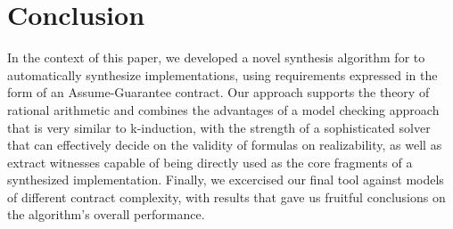 \section{Conclusion}
\label{sec:conclusion}
In the context of this paper, we developed a novel synthesis algorithm for
to automatically synthesize implementations, using requirements expressed in the
form of an Assume-Guarantee contract. Our approach supports the theory of
rational arithmetic and combines the advantages of a model checking approach
that is very similar to k-induction, with the strength of a sophisticated solver
that can effectively decide on the validity of formulas on realizability, as
well as extract witnesses capable of being directly used as the core fragments
of a synthesized implementation. Finally, we excercised our final tool against
models of different contract complexity, with results that gave us fruitful
conclusions on the algorithm's overall performance.
